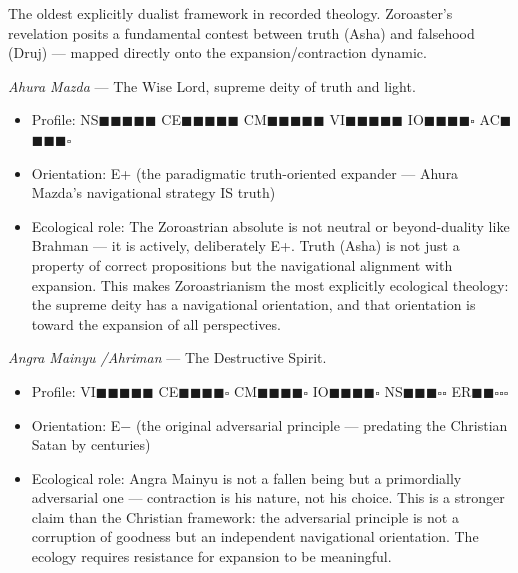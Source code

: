 The oldest explicitly dualist framework in recorded theology. Zoroaster's revelation posits a fundamental contest between truth (Asha) and falsehood (Druj) — mapped directly onto the expansion/\allowbreak contraction dynamic.


\textit{Ahura Mazda} — The Wise Lord, supreme deity of truth and light.

\begin{itemize}[nosep,leftmargin=*]
  \item Profile: NS$\blacksquare$$\blacksquare$$\blacksquare$$\blacksquare$$\blacksquare$ CE$\blacksquare$$\blacksquare$$\blacksquare$$\blacksquare$$\blacksquare$ CM$\blacksquare$$\blacksquare$$\blacksquare$$\blacksquare$$\blacksquare$ VI$\blacksquare$$\blacksquare$$\blacksquare$$\blacksquare$$\blacksquare$ IO$\blacksquare$$\blacksquare$$\blacksquare$$\blacksquare$$\square$ AC$\blacksquare$$\blacksquare$$\blacksquare$$\blacksquare$$\square$
  \item Orientation: E+ (the paradigmatic truth-oriented expander — Ahura Mazda's navigational strategy IS truth)
  \item Ecological role: The Zoroastrian absolute is not neutral or beyond-duality like Brahman — it is actively, deliberately E+. Truth (Asha) is not just a property of correct propositions but the navigational alignment with expansion. This makes Zoroastrianism the most explicitly ecological theology: the supreme deity has a navigational orientation, and that orientation is toward the expansion of all perspectives.
\end{itemize}


\textit{Angra Mainyu /\allowbreak  Ahriman} — The Destructive Spirit.

\begin{itemize}[nosep,leftmargin=*]
  \item Profile: VI$\blacksquare$$\blacksquare$$\blacksquare$$\blacksquare$$\blacksquare$ CE$\blacksquare$$\blacksquare$$\blacksquare$$\blacksquare$$\square$ CM$\blacksquare$$\blacksquare$$\blacksquare$$\blacksquare$$\square$ IO$\blacksquare$$\blacksquare$$\blacksquare$$\blacksquare$$\square$ NS$\blacksquare$$\blacksquare$$\blacksquare$$\square$$\square$ ER$\blacksquare$$\blacksquare$$\square$$\square$$\square$
  \item Orientation: E− (the original adversarial principle — predating the Christian Satan by centuries)
  \item Ecological role: Angra Mainyu is not a fallen being but a primordially adversarial one — contraction is his nature, not his choice. This is a stronger claim than the Christian framework: the adversarial principle is not a corruption of goodness but an independent navigational orientation. The ecology requires resistance for expansion to be meaningful.
\end{itemize}


